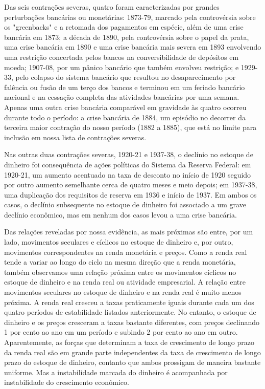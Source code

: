 \documentclass[12pt]{article}
\begin{document}
Das seis contrações severas, quatro foram caracterizadas por grandes perturbações bancárias ou monetárias: 1873-79, marcado pela controvérsia sobre os "greenbacks" e a retomada dos pagamentos em espécie, além de uma crise bancária em 1873; a década de 1890, pela controvérsia sobre o papel da prata, uma crise bancária em 1890 e uma crise bancária mais severa em 1893 envolvendo uma restrição concertada pelos bancos na conversibilidade de depósitos em moeda; 1907-08, por um pânico bancário que também envolveu restrição; e 1929-33, pelo colapso do sistema bancário que resultou no desaparecimento por falência ou fusão de um terço dos bancos e terminou em um feriado bancário nacional e na cessação completa das atividades bancárias por uma semana. Apenas uma outra crise bancária comparável em gravidade às quatro ocorreu durante todo o período: a crise bancária de 1884, um episódio no decorrer da terceira maior contração do nosso período (1882 a 1885), que está no limite para inclusão em nossa lista de contrações severas.

Nas outras duas contrações severas, 1920-21 e 1937-38, o declínio no estoque de dinheiro foi consequência de ações políticas do Sistema da Reserva Federal: em 1920-21, um aumento acentuado na taxa de desconto no início de 1920 seguido por outro aumento semelhante cerca de quatro meses e meio depois; em 1937-38, uma duplicação dos requisitos de reserva em 1936 e início de 1937. Em ambos os casos, o declínio subsequente no estoque de dinheiro foi associado a um grave declínio econômico, mas em nenhum dos casos levou a uma crise bancária.

Das relações reveladas por nossa evidência, as mais próximas são entre, por um lado, movimentos seculares e cíclicos no estoque de dinheiro e, por outro, movimentos correspondentes na renda monetária e preços. Como a renda real tende a variar ao longo do ciclo na mesma direção que a renda monetária, também observamos uma relação próxima entre os movimentos cíclicos no estoque de dinheiro e na renda real ou atividade empresarial. A relação entre movimentos seculares no estoque de dinheiro e na renda real é muito menos próxima. A renda real cresceu a taxas praticamente iguais durante cada um dos quatro períodos de estabilidade listados anteriormente. No entanto, o estoque de dinheiro e os preços cresceram a taxas bastante diferentes, com preços declinando 1 por cento ao ano em um período e subindo 2 por cento ao ano em outro. Aparentemente, as forças que determinam a taxa de crescimento de longo prazo da renda real são em grande parte independentes da taxa de crescimento de longo prazo do estoque de dinheiro, contanto que ambos prossigam de maneira bastante uniforme. Mas a instabilidade marcada do dinheiro é acompanhada por instabilidade do crescimento econômico.
\end{document}
